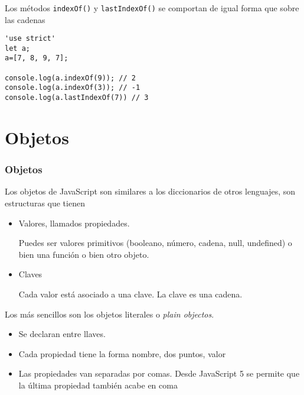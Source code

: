 \documentclass[ucs]{beamer}
\begin{document}
\begin{frame}[fragile]
\frametitle{}
Los métodos
\verb|indexOf()|
y
\verb|lastIndexOf()|
se comportan de igual forma que sobre las cadenas


  \begin{scriptsize}
  \begin{verbatim}
'use strict'
let a;
a=[7, 8, 9, 7];

console.log(a.indexOf(9)); // 2
console.log(a.indexOf(3)); // -1
console.log(a.lastIndexOf(7)) // 3
  \end{verbatim}
  \end{scriptsize}


\end{frame}


\section{Objetos}
\begin{frame}[fragile]
\frametitle{Objetos}
Los objetos de JavaScript son similares a los diccionarios de otros lenguajes,
son estructuras que tienen 


    \begin{itemize}
    \item
Valores, llamados propiedades. 

Puedes ser valores primitivos (booleano, número, cadena, null, undefined) o bien una función o bien otro objeto.

    \item
Claves

Cada valor está asociado a una clave. La clave es una cadena.
    \end{itemize}


Los más sencillos son los objetos literales
o \emph{plain objectos}.

\begin{itemize}
\item
Se declaran entre llaves.
\item
Cada propiedad tiene la forma
nombre, dos puntos, valor
\item
Las propiedades van separadas por comas. Desde JavaScript 5 se permite
que la última propiedad también acabe en coma

\end{itemize}

\end{frame}
\end{document}
